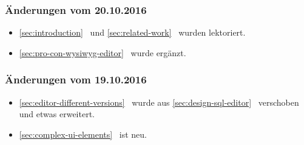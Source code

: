 \documentclass[paper=a4,fontsize=12pt,parskip=half,twoside]{scrartcl}
\begin{document}
\subsubsection*{Änderungen vom 20.10.2016}
\begin{itemize}[noitemsep]
\item \ref{sec:introduction}~ und \ref{sec:related-work}~ wurden lektoriert.
\item \ref{sec:pro-con-wysiwyg-editor}~ wurde ergänzt.
\end{itemize}

\subsubsection*{Änderungen vom 19.10.2016}
\begin{itemize}[noitemsep]
\item \ref{sec:editor-different-versions}~ wurde aus \ref{sec:design-sql-editor}~ verschoben und etwas erweitert.
\item \ref{sec:complex-ui-elements}~ ist neu.
\end{itemize}

\newpage
\tableofcontents{}

\cleardoublepage


\cleardoublepage


\cleardoublepage


\cleardoublepage


\cleardoublepage


\cleardoublepage


\appendix{}

\cleardoublepage


\cleardoublepage


\cleardoublepage


\cleardoublepage


\listoftodos[Notes]

\printbibliography
\end{document}
